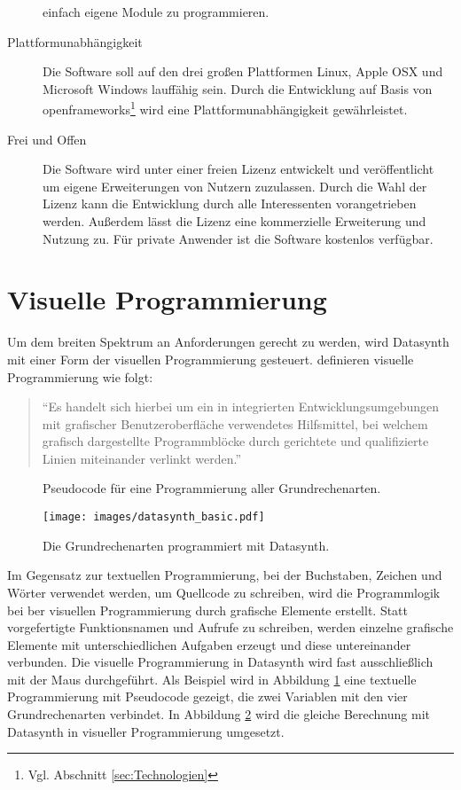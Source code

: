 \documentclass[a4paper, 12pt, DIV=calc, version=first, pdftex, headsepline, footsepline, bibtotocnumbered, liststotocnumbered]{scrreprt}
\begin{document}
\begin{description}
einfach eigene Module zu programmieren.
\item[Plattformunabhängigkeit]
Die Software soll auf den drei großen Plattformen Linux, Apple OSX und Microsoft Windows
lauffähig sein. Durch die Entwicklung auf Basis von openframeworks\footnote{Vgl. Abschnitt \ref{sec:Technologien}}
wird eine Plattformunabhängigkeit gewährleistet.
\item[Frei und Offen]
Die Software wird unter einer freien Lizenz entwickelt und veröffentlicht
um eigene Erweiterungen von Nutzern zuzulassen. Durch die Wahl der Lizenz kann
die Entwicklung durch alle Interessenten vorangetrieben werden. Außerdem lässt
die Lizenz eine kommerzielle Erweiterung und Nutzung zu. Für private Anwender
ist die Software kostenlos verfügbar.
\end{description}

\section{Visuelle Programmierung}
\label{sec:visPro}
Um dem breiten Spektrum an Anforderungen gerecht zu werden,
wird Datasynth mit einer Form der visuellen Programmierung gesteuert.
\citep[S.\,56]{Henning} definieren visuelle Programmierung wie folgt:
\begin{quote}
"`Es handelt sich hierbei um ein in integrierten Entwicklungsumgebungen mit
grafischer Benutzeroberfläche verwendetes Hilfsmittel, bei welchem grafisch
dargestellte Programmblöcke durch gerichtete und qualifizierte Linien miteinander
verlinkt werden."'
\end{quote}
\begin{figure}
\centering

\caption{Pseudocode für eine Programmierung aller Grundrechenarten.}
\label{fig:textuell}
\end{figure}
\begin{figure}
\centering
\texttt{[image: images/datasynth\_basic.pdf]}
\caption{Die Grundrechenarten programmiert mit Datasynth.}
\label{fig:datasynth_basic}
\end{figure}
Im Gegensatz zur textuellen Programmierung, bei der Buchstaben, Zeichen und Wörter
verwendet werden, um Quellcode zu schreiben, wird die Programmlogik bei ber
visuellen Programmierung durch grafische Elemente erstellt.
Statt vorgefertigte Funktionsnamen und Aufrufe zu schreiben, werden einzelne grafische
Elemente mit unterschiedlichen Aufgaben erzeugt und diese untereinander verbunden. Die visuelle Programmierung
in Datasynth wird fast ausschließlich mit der Maus durchgeführt.
Als Beispiel wird in Abbildung
\ref{fig:textuell} eine textuelle Programmierung mit Pseudocode gezeigt, die zwei Variablen mit den vier Grundrechenarten verbindet.
In Abbildung \ref{fig:datasynth_basic} wird die gleiche Berechnung mit Datasynth
in visueller Programmierung umgesetzt.
\end{document}
